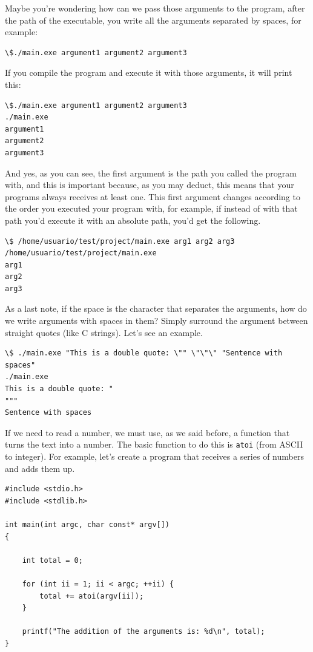 \documentclass[a4paper]{article}
\begin{document}
Maybe you're wondering how can we pass those arguments to the program, after the
path of the executable, you write all the arguments separated by spaces, for
example:
\begin{lstlisting}[style=terminalStyle]
\$./main.exe argument1 argument2 argument3
\end{lstlisting}
If you compile the program and execute it with those arguments, it will print
this:

\begin{lstlisting}[style=terminalStyle]
\$./main.exe argument1 argument2 argument3
./main.exe
argument1
argument2
argument3
\end{lstlisting}

And yes, as you can see, the first argument is the path you called the
program with, and this is important because, as you may deduct, this means
that your programs always receives at least one. This first argument changes
according to the order you executed your program with, for example, if instead
of with that path you'd execute it with an absolute path, you'd get the
following.

\begin{lstlisting}[style=terminalStyle]
\$ /home/usuario/test/project/main.exe arg1 arg2 arg3
/home/usuario/test/project/main.exe
arg1
arg2
arg3
\end{lstlisting}

As a last note, if the space is the character that separates the arguments, how
do we write arguments with spaces in them? Simply surround the argument between
straight quotes (like C strings). Let's see an example.
\begin{lstlisting}[style=terminalStyle]
\$ ./main.exe "This is a double quote: \"" \"\"\" "Sentence with spaces"
./main.exe
This is a double quote: "
"""
Sentence with spaces
\end{lstlisting}

If we need to read a number, we must use, as we said before, a function that
turns the text into a number. The basic function to do this is \verb!atoi!
(from ASCII to integer). For example, let's create a program that receives a
series of numbers and adds them up.

\noindent
\begin{minipage}[H]{\linewidth}
\mbox{}
\begin{lstlisting}[style=C,
caption={Program that adds its arguments},
label={lst:sumArgs}]
#include <stdio.h>
#include <stdlib.h>

int main(int argc, char const* argv[])
{

    int total = 0;

    for (int ii = 1; ii < argc; ++ii) {
        total += atoi(argv[ii]);
    }

    printf("The addition of the arguments is: %d\n", total);
}
\end{lstlisting}
\end{minipage}
\end{document}
